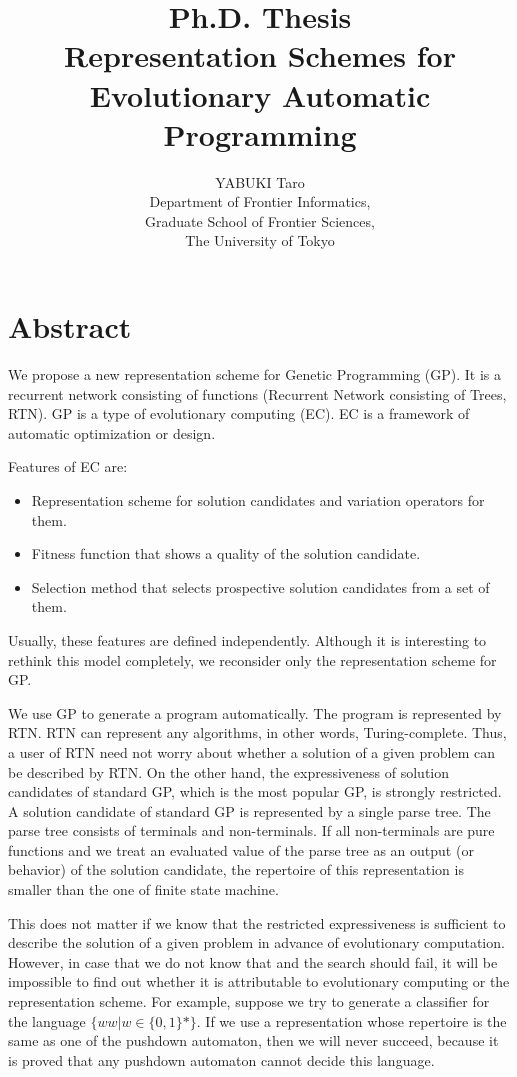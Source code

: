 \documentclass[9pt]{jsarticle}
\title{Ph.D. Thesis\\
Representation Schemes for Evolutionary Automatic Programming}
\author{YABUKI Taro\\
Department of Frontier Informatics,\\
Graduate School of Frontier Sciences,\\
The University of Tokyo}
\date{}
\begin{document}
\maketitle
\section*{Abstract}

We propose a new representation scheme for Genetic Programming (GP). It is a recurrent network consisting of functions (Recurrent Network consisting of Trees, RTN). GP is a type of evolutionary computing (EC). EC is a framework of automatic optimization or design.

Features of EC are:
\begin{itemize}
  \item Representation scheme for solution candidates and variation operators for them.
  \item Fitness function that shows a quality of the solution candidate.
  \item Selection method that selects prospective solution candidates from a set of them.
\end{itemize}
Usually, these features are defined independently. Although it is interesting to rethink this model completely, we reconsider only the representation scheme for GP.

We use GP to generate a program automatically. The program is represented by RTN. RTN can represent any algorithms, in other words, Turing-complete. Thus, a user of RTN need not worry about whether a solution of a given problem can be described by RTN. On the other hand, the expressiveness of solution candidates of standard GP, which is the most popular GP, is strongly restricted. A solution candidate of standard GP is represented by a single parse tree. The parse tree consists of terminals and non-terminals. If all non-terminals are pure functions and we treat an evaluated value of the parse tree as an output (or behavior) of the solution candidate, the repertoire of this representation is smaller than the one of finite state machine.

This does not matter if we know that the restricted expressiveness is sufficient to describe the solution of a given problem in advance of evolutionary computation. However, in case that we do not know that and the search should fail, it will be impossible to find out whether it is attributable to evolutionary computing or the representation scheme. For example, suppose we try to generate a classifier for the language $\{ww|w\in\{0,1\}*\}$. If we use a representation whose repertoire is the same as one of the pushdown automaton, then we will never succeed, because it is proved that any pushdown automaton cannot decide this language.
\end{document}
